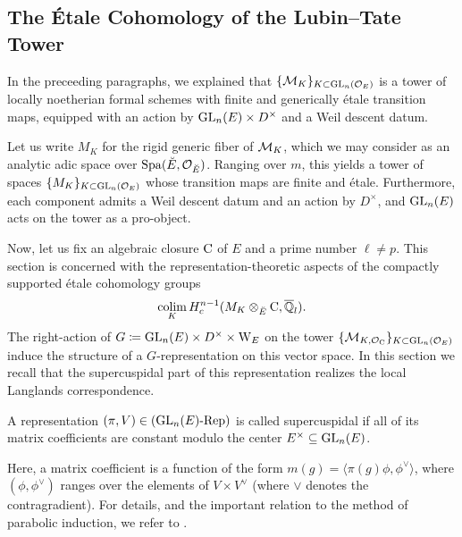 \documentclass[../main.tex]{subfiles}
\begin{document}

\subsection{The \'Etale Cohomology of the Lubin--Tate Tower} %
\label{sub:The Local Langlands Correspondence for the General Linear Group}
In the preceeding paragraphs, we explained that $\{\mathcal{M}_{K}\}_{K \subset
\operatorname{GL}_n(\mathcal{O}_E)}$ is a 
tower of locally noetherian formal schemes with finite and generically \'etale 
transition maps, equipped with an action by $\operatorname{GL}_n(E) \times D^\times$ and 
a Weil descent datum. 

Let us write $M_{K}$ for the rigid generic fiber of $\mathcal{M}_{K}$,
which we may consider as an analytic adic space over $\operatorname{Spa}({\breve {E}},\mathcal{O}_{\breve {E}})$. 
Ranging over $m$, this yields a tower of spaces $\{M_{K}\}_{K \subset
\operatorname{GL}_n(\mathcal{O}_E)}$ whose transition maps are finite and \'etale. Furthermore, each
component admits a Weil descent datum and an action by $D^\times$, and $\operatorname{GL}_n(E)$
acts on the tower as a pro-object. 

Now, let us fix an algebraic closure ${\mathrm{C}}$ of $E$ and a prime number $\ell
\neq p$. This section is concerned with the representation-theoretic aspects of
the compactly supported \'etale cohomology groups
\begin{equation*}
  \operatorname*{colim}_K H^{n-1}_c (M_{K} \otimes_{{\breve {E}}} {\mathrm{C}}, \overline {\mathbb{Q}}_l).
\end{equation*}
The right-action of $G \coloneqq \operatorname{GL}_n(E) \times D^\times \times \mathrm W_E$ on the tower
$\{\mathcal{M}_{K, \mathcal{O}_{\mathrm{C}}}\}_{K \subset \operatorname{GL}_n(\mathcal{O}_E)}$ induce the structure of a
$G$-representation on this vector space. 
In this section we recall that the supercuspidal part of this representation
realizes the local Langlands correspondence. 

\begin{defi}\label{def:SuperCusp}
  A representation $(\pi,V) \in {({\operatorname{GL}_n(E)}\text-\allowbreak\mathrm{Rep})}$ is called supercuspidal if all
  of its matrix coefficients are constant modulo the center $E^\times \subseteq
  \operatorname{GL}_n(E)$.
\end{defi}
Here, a matrix coefficient is a function of the form $m(g) = \langle \pi(g)
\phi, \phi^\vee\rangle$, where $(\phi, \phi^\vee)$ ranges over the elements of
$V \times V^\vee$ (where $\vee$ denotes the contragradient). For details, and
the important relation to the method of parabolic induction, we refer to
\cite[Section 8]{getz2023introduction}.
\end{document}
